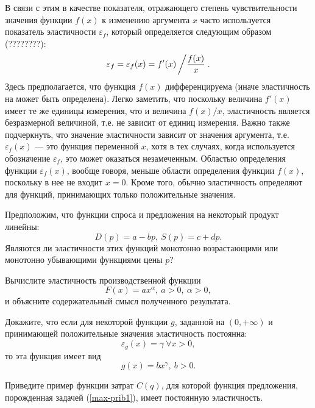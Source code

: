      В связи с этим в качестве показателя, отражающего степень
     чувствительности значения функции $f(x)$ к изменению
     аргумента $x$ часто используется показатель эластичности $\varepsilon_{f}$,
     который определяется следующим образом (????????):
    \[\varepsilon_{f}=\varepsilon_{f}(x)=f'(x)\left/\frac{f(x)}{x}\right. .\]
    Здесь предполагается, что функция $f(x)$ дифференцируема (иначе
    эластичность на может быть определена). Легко заметить, что
    поскольку величина $f'(x)$ имеет те же единицы измерения,
    что и величина $f(x)/x$,  эластичность является безразмерной величиной,
    т.е. не зависит от единиц измерения. Важно
    также подчеркнуть, что значение эластичности зависит от значения
    аргумента, т.е. $\varepsilon_{f}(x)$ --- это функция переменной $x$, хотя в тех
    случаях, когда используется обозначение $\varepsilon_{f}$, это может оказаться
    незамеченным. Областью определения функции $\varepsilon_{f}(x)$, вообще говоря,
    меньше области определения функции $f(x)$, поскольку в нее не входит
    $x=0$. Кроме того, обычно эластичность определяют для функций,
    принимающих только положительные значения.




\begin{exer}
        Предположим, что функции спроса и предложения
    на некоторый продукт линейны:
    \[D(p)=a-bp, \ S(p)=c+dp.\]
    Являются ли эластичности этих функций монотонно возрастающими
    или монотонно убывающими функциями цены $p$?
\end{exer}

\begin{exer}
    Вычислите эластичность производственной функции
    \[F(x)=ax^{\alpha}, \ a>0, \ \alpha>0,\]
    и объясните содержательный смысл полученного результата.
\end{exer}

\begin{exer}
    Докажите, что если для некоторой функции
    $g$, заданной на $(0,+\infty)$ и принимающей положительные значения
    эластичность постоянна:
    \[\varepsilon_{g}(x)=\gamma \ \forall x>0,\]
    то эта функция имеет вид
    \[g(x)=bx^{\gamma}, \ b>0.\]
\end{exer}

\begin{exer}
    Приведите пример функции затрат $C(q)$, для которой функция предложения, порожденная
    задачей (\ref{max-prib1}), имеет постоянную эластичность.
\end{exer}

